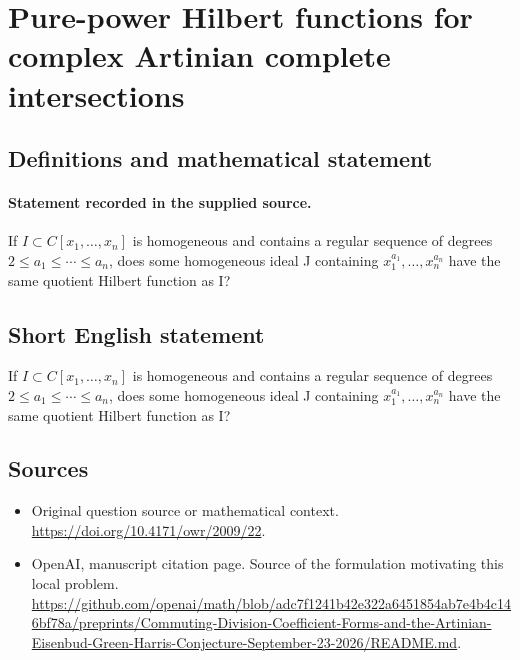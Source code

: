 \documentclass[11pt]{article}
\begin{document}
\section*{Pure-power Hilbert functions for complex Artinian complete intersections}\label{30006989}
\subsection{Definitions and mathematical statement}
\paragraph{Statement recorded in the supplied source.}
If $I\subset C[x_{1},\dots ,x_{n}]$ is homogeneous and contains a regular sequence of degrees $2\leq a_{1}\leq \cdots \leq a_{n}$, does some homogeneous ideal J containing $x_{1}^{a_{1}},\dots ,x_{n}^{a_{n}}$ have the same quotient Hilbert function as I?
\subsection{Short English statement}
If $I\subset C[x_{1},\dots ,x_{n}]$ is homogeneous and contains a regular sequence of degrees $2\leq a_{1}\leq \cdots \leq a_{n}$, does some homogeneous ideal J containing $x_{1}^{a_{1}},\dots ,x_{n}^{a_{n}}$ have the same quotient Hilbert function as I?
\subsection{Sources}
\begin{itemize}
\item[S1] Original question source or mathematical context.
\url{https://doi.org/10.4171/owr/2009/22}.
\item[S2] OpenAI, manuscript citation page. Source of the formulation motivating this local problem.
\url{https://github.com/openai/math/blob/adc7f1241b42e322a6451854ab7e4b4c146bf78a/preprints/Commuting-Division-Coefficient-Forms-and-the-Artinian-Eisenbud-Green-Harris-Conjecture-September-23-2026/README.md}.
\end{itemize}
\end{document}
